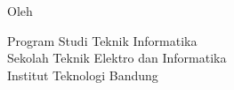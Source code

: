 \clearpage
\pagestyle{empty}

\begin{center}
	\smallskip

	\Large \bfseries \MakeUppercase{\thetitle}
	\vfill

	\subtitle
	\vfill

	\large Oleh

	\Large \theauthor

	\large Program Studi Teknik Informatika \\

	\normalsize \normalfont
	Sekolah Teknik Elektro dan Informatika \\
	Institut Teknologi Bandung

	\vfill
	\pembimbingTtd

\end{center}
\clearpage
